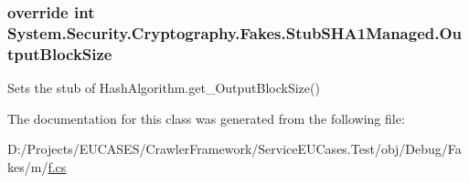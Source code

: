 \hypertarget{class_system_1_1_security_1_1_cryptography_1_1_fakes_1_1_stub_s_h_a1_managed_a4f5246940a52ccea6d669a21d491b0e0}{
\subsubsection[{Output\-Block\-Size}]{\setlength{\rightskip}{0pt plus 5cm}override int System.\-Security.\-Cryptography.\-Fakes.\-Stub\-S\-H\-A1\-Managed.\-Output\-Block\-Size\hspace{0.3cm}{\ttfamily [get]}}}\label{class_system_1_1_security_1_1_cryptography_1_1_fakes_1_1_stub_s_h_a1_managed_a4f5246940a52ccea6d669a21d491b0e0}


Sets the stub of Hash\-Algorithm.\-get\-\_\-\-Output\-Block\-Size()



The documentation for this class was generated from the following file\-:\begin{DoxyCompactItemize}
\item 
D\-:/\-Projects/\-E\-U\-C\-A\-S\-E\-S/\-Crawler\-Framework/\-Service\-E\-U\-Cases.\-Test/obj/\-Debug/\-Fakes/m/\hyperlink{m_2f_8cs}{f.\-cs}\end{DoxyCompactItemize}

